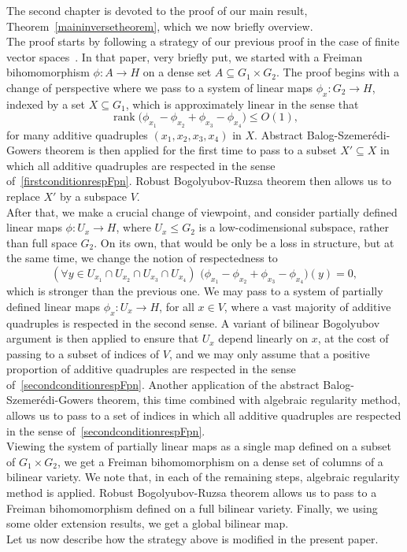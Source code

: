 \documentclass[a4paper,11pt]{article}
\numberwithin{theorem}{section}
\theoremstyle{definition}
\newcommand{\on}[1]{
	\operatorname{#1}
}
\begin{document}
The second chapter is devoted to the proof of our main result, Theorem~\ref{maininversetheorem}, 
which we now briefly overview.\\
\indent The proof starts by following a strategy of our previous proof in the case of finite vector spaces~\cite{newU4}. In that paper, very briefly put, we started with a Freiman bihomomorphism $\phi : A \to H$ on a dense set $A \subseteq G_1 \times G_2$. The proof begins with a change of perspective where we pass to a system of linear maps $\phi_x: G_2 \to H$, indexed by a set $X \subseteq G_1$, which is approximately linear in the sense that
\begin{equation}
    \on{rank} \Big(\phi_{x_1} - \phi_{x_2} + \phi_{x_3} - \phi_{x_4}\Big) \leq O(1),\label{firstconditionrespFpn}
\end{equation}
for many additive quadruples $(x_1, x_2, x_3, x_4)$ in $X$. Abstract Balog-Szemer\'edi-Gowers theorem is then applied for the first time to pass to a subset $X' \subseteq X$ in which all additive quadruples are respected in the sense of~\eqref{firstconditionrespFpn}. Robust Bogolyubov-Ruzsa theorem then allows us to replace $X'$ by a subspace $V$.\\
\indent After that, we make a crucial change of viewpoint, and consider partially defined linear maps $\phi: U_x \to H$, where $U_x \leq G_2$ is a low-codimensional subspace, rather than full space $G_2$. On its own, that would be only be a loss in structure, but at the same time, we change the notion of respectedness to 
\begin{equation}
   (\forall y \in U_{x_1} \cap U_{x_2} \cap U_{x_3} \cap U_{x_4})\,\, \Big(\phi_{x_1} - \phi_{x_2} + \phi_{x_3} - \phi_{x_4}\Big)(y) = 0,\label{secondconditionrespFpn}
\end{equation}
which is stronger than the previous one. We may pass to a system of partially defined linear maps $\phi_x : U_x \to H$, for all $x \in V$, where a vast majority of additive quadruples is respected in the second sense. A variant of bilinear Bogolyubov argument is then applied to ensure that $U_x$ depend linearly on $x$, at the cost of passing to a subset of indices of $V$, and we may only assume that a positive proportion of additive quadruples are respected in the sense of~\eqref{secondconditionrespFpn}. Another application of the abstract Balog-Szemer\'edi-Gowers theorem, this time combined with algebraic regularity method, allows us to pass to a set of indices in which all additive quadruples are respected in the sense of~\eqref{secondconditionrespFpn}.\\
\indent Viewing the system of partially linear maps as a single map defined on a subset of $G_1 \times G_2$, we get a Freiman bihomomorphism on a dense set of columns of a bilinear variety. We note that, in each of the remaining steps, algebraic regularity method is applied. Robust Bogolyubov-Ruzsa theorem allows us to pass to a Freiman bihomomorphism defined on a full bilinear variety. Finally, we using some older extension results, we get a global bilinear map.\\
\indent Let us now describe how the strategy above is modified in the present paper.\\
\end{document}
